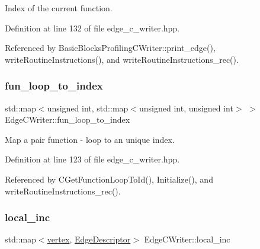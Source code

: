 Index of the current function. 



Definition at line 132 of file edge\+\_\+c\+\_\+writer.\+hpp.



Referenced by Basic\+Blocks\+Profiling\+C\+Writer\+::print\+\_\+edge(), write\+Routine\+Instructions(), and write\+Routine\+Instructions\+\_\+rec().

\mbox{\label{classEdgeCWriter_aae33614ac66605c84a7ccc1552af424f}} 
\subsubsection{\texorpdfstring{fun\+\_\+loop\+\_\+to\+\_\+index}{fun\_loop\_to\_index}}
{\footnotesize\ttfamily std\+::map$<$unsigned int, std\+::map$<$unsigned int, unsigned int$>$ $>$ Edge\+C\+Writer\+::fun\+\_\+loop\+\_\+to\+\_\+index\hspace{0.3cm}{\ttfamily [protected]}}



Map a pair function -\/ loop to an unique index. 



Definition at line 123 of file edge\+\_\+c\+\_\+writer.\+hpp.



Referenced by C\+Get\+Function\+Loop\+To\+Id(), Initialize(), and write\+Routine\+Instructions\+\_\+rec().

\mbox{\label{classEdgeCWriter_a7b417f4e7cc68c365e804828f5ced098}} 
\subsubsection{\texorpdfstring{local\+\_\+inc}{local\_inc}}
{\footnotesize\ttfamily std\+::map$<$\hyperlink{graph_8hpp_abefdcf0544e601805af44eca032cca14}{vertex}, \hyperlink{graph_8hpp_a9eb9afea34e09f484b21f2efd263dd48}{Edge\+Descriptor}$>$ Edge\+C\+Writer\+::local\+\_\+inc\hspace{0.3cm}{\ttfamily [protected]}}



